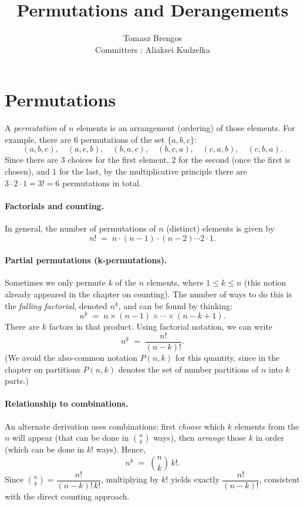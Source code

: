 \documentclass[docmute]{article}
\title{Permutations and Derangements}
\author{Tomasz Brengos \\  
Committers : Aliaksei Kudzelka}
\date{}
\begin{document}
\maketitle

\section{Permutations}
A \emph{permutation} of $n$ elements is an arrangement (ordering) of those elements.
For example, there are $6$ permutations of the set $\{a,b,c\}$:
\[
(a,b,c), \quad (a,c,b), \quad (b,a,c), \quad (b,c,a), \quad (c,a,b), \quad (c,b,a).
\]
Since there are $3$ choices for the first element, $2$ for the second (once the first is chosen), and $1$ for the last, by the multiplicative principle there are $3 \cdot 2 \cdot 1 = 3! = 6$ permutations in total.

\paragraph{Factorials and counting.}
In general, the number of permutations of $n$ (distinct) elements is given by
\[
n! \;=\; n \cdot (n-1) \cdot (n-2) \cdots 2 \cdot 1.
\]


\paragraph{Partial permutations (k-permutations).}
Sometimes we only permute $k$ of the $n$ elements, where $1 \le k \le n$ (this notion already appeared in the chapter on counting). The number of ways to do this is the \emph{falling factorial}, denoted $n^{\underline{k}}$, and can be found by thinking:
\[
n^{\underline{k}} \;=\; n \times (n-1) \times \cdots \times (n-k+1).
\]
There are $k$ factors in that product. Using factorial notation, we can write
\[
n^{\underline{k}} \;=\; \frac{n!}{(n-k)!}.
\]
(We avoid the also-common notation $P(n,k)$ for this quantity, since in the chapter on partitions $P(n,k)$ denotes the set of number partitions of $n$ into $k$ parts.)

\paragraph{Relationship to combinations.}
An alternate derivation uses combinations: first \emph{choose} which $k$ elements from the $n$ will appear (that can be done in $\binom{n}{k}$ ways), then \emph{arrange} those $k$ in order (which can be done in $k!$ ways). Hence,
\[
n^{\underline{k}} \;=\; \binom{n}{k} \, k!.
\]
Since $\binom{n}{k} = \dfrac{n!}{(n-k)!\,k!}$, multiplying by $k!$ yields exactly $\dfrac{n!}{(n-k)!}$, consistent with the direct counting approach.
\end{document}
